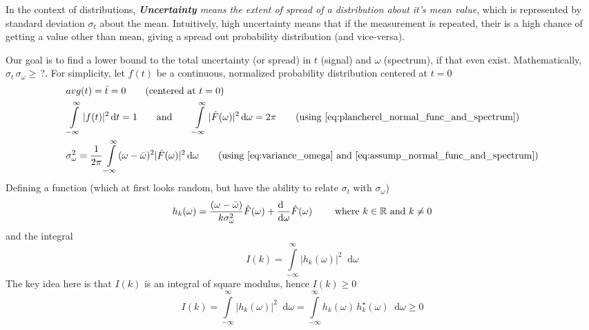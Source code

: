 \documentclass[11pt, a4paper]{article}
\newcommand{\eqrefnp}[1]{\textup{\ref{#1}}}
\newcommand{\variance}[1]{\sigma_{#1}^{2}}
\newcommand{\stdev}[1]{\sigma_{#1}}
\newcommand{\diff}{\mathop{}\!\mathrm{d}}
\newcommand{\dt}{\diff t}
\newcommand{\domega}{\diff \omega}
\newcommand{\derv}[1]{\frac{\diff \hfill}{\diff #1}}	%
\newcommand{\dint}[2]{\int \limits_{#1}^{#2}}  %
\newcommand{\intinfty}{\dint{-\infty}{\infty}}	%
\begin{document}
In the context of distributions, \textit{\textbf{Uncertainty} means the extent of spread of a distribution about it's mean value}, which is represented by standard deviation $\stdev{t}$ about the mean. Intuitively, high uncertainty means that if the measurement is repeated, their is a high chance of getting a value other than mean, giving a spread out probability distribution (and vice-versa).

\vspace{4pt}
Our goal is to find a lower bound to the total uncertainty (or spread) in $t$ (signal) and $\omega$ (spectrum), if that even exist. Mathematically, $\stdev{t}\, \stdev{\omega} \geq \, ?$. For simplicity, let $f(t)$ be a continuous, normalized probability distribution centered at $t=0$
\begin{subequations}
	\begin{align}
		& avg(t) = \bar{t} = 0 \qquad \text{(centered at $t = 0$)} \label{eq:assump_avg_t_0} \\
		& \intinfty |f(t)|^{2} \dt = 1 \qquad \text{and} \qquad \intinfty |\hat{F}(\omega)|^{2} \domega = 2\pi \qquad \text{(using \eqrefnp{eq:plancherel_normal_func_and_spectrum})} \label{eq:assump_normal_func_and_spectrum} \\
		& \variance{\omega} = \frac{1}{2\pi} \intinfty (\omega - \bar{\omega})^{2} |\hat{F}(\omega)|^{2} \domega  \qquad \text{(using \eqrefnp{eq:variance_omega} and \eqrefnp{eq:assump_normal_func_and_spectrum})} \label{eq:assump_variance_omega}
	\end{align}
\end{subequations}
Defining a function (which at first looks random, but have the ability to relate $\stdev{t}$ with $\stdev{\omega}$)\cite{dubey2021fourieruncertainity}
\begin{equation}\label{eq:uncertainity_main_functionl}
	h_{k}(\omega) = \frac{(\omega - \bar{\omega})}{k \variance{\omega}} \hat{F}(\omega) + \derv{\omega}\hat{F}(\omega) \qquad \text{ where } k \in \mathbb{R} \text{ and } k \neq 0
\end{equation}
and the integral 
\begin{equation}\label{eq:uncertainity_main_integral}
	I(k) = \intinfty |h_{k}(\omega)|^2 \domega
\end{equation}
The key idea here is that $I(k)$ is an integral of square modulus, hence $I(k) \geq 0$
\begin{equation}\label{eq:uncertainity_main_integral_geq_0}
	I(k) = \intinfty |h_{k}(\omega)|^2 \domega = \intinfty h_{k}(\omega) \, h_{k}^{\star}(\omega) \domega \geq 0
\end{equation}
\end{document}
